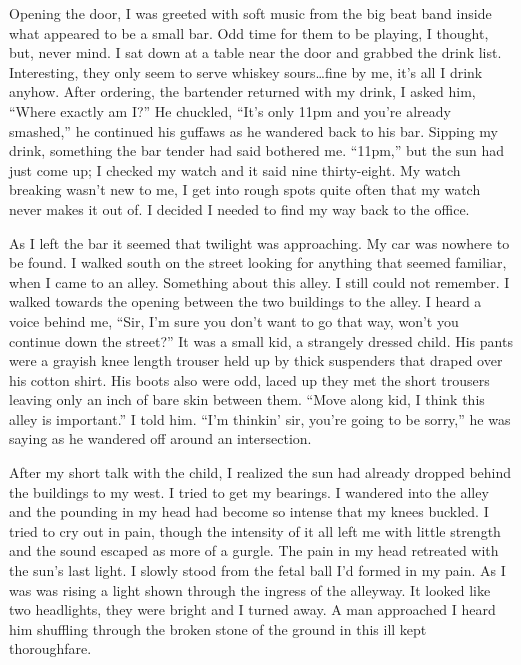 Opening the door, I was greeted with soft music from the big beat
band inside what appeared to be a small bar. Odd time for them to
be playing, I thought, but, never mind. I sat down at a table near
the door and grabbed the drink list. Interesting, they only seem to
serve whiskey sours{\ldots}fine by me, it's all I drink anyhow. After
ordering, the bartender returned with my drink, I asked him, ``Where
exactly am I?'' He chuckled, ``It's only 11pm and you're already
smashed,'' he continued his guffaws as he wandered back to his bar.
Sipping my drink, something the bar tender had said bothered me.
``11pm,'' but the sun had just come up; I checked my watch and it
said nine thirty-eight. My watch breaking wasn't new to me, I get
into rough spots quite often that my watch never makes it out of. I
decided I needed to find my way back to the office.



As I left the bar it seemed that twilight was approaching. My car
was nowhere to be found. I walked south on the street looking for
anything that seemed familiar, when I came to an alley. Something
about this alley. I still could not remember. I walked towards the
opening between the two buildings to the alley. I heard a voice
behind me, ``Sir, I'm sure you don't want to go that way, won't you
continue down the street?'' It was a small kid, a strangely dressed
child. His pants were a grayish knee length trouser held up by
thick suspenders that draped over his cotton shirt. His boots also
were odd, laced up they met the short trousers leaving only an inch
of bare skin between them. ``Move along kid, I think this alley is
important.'' I told him. ``I'm thinkin' sir, you're going to be
sorry,'' he was saying as he wandered off around an
intersection.



After my short talk with the child, I realized the sun had already
dropped behind the buildings to my west. I tried to get my
bearings. I wandered into the alley and the pounding in my head had
become so intense that my knees buckled. I tried to cry out in
pain, though the intensity of it all left me with little strength
and the sound escaped as more of a gurgle. The pain in my head
retreated with the sun's last light. I slowly stood from the fetal
ball I'd formed in my pain. As I was was rising a light shown
through the ingress of the alleyway. It looked like two headlights,
they were bright and I turned away. A man approached I heard him
shuffling through the broken stone of the ground in this ill kept
thoroughfare.



